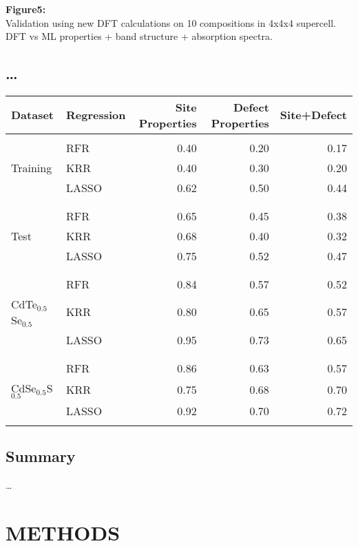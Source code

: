 \documentclass[aip, jmp, amsmath, amssymb]{revtex4-2}
\begin{document}
\textbf{Figure5:}\\
Validation using new DFT calculations on 10 compositions in 4x4x4
supercell. DFT vs ML properties + band structure + absorption spectra.\\

\subsection*{\ldots{}}
\label{sec:orgc05ecba}
\begin{center}
\begin{tabular}{llrrr}
\textbf{Dataset} & \textbf{Regression} & \textbf{Site Properties} & \textbf{Defect Properties} & \textbf{Site+Defect}\\
\hline
 &  &  &  & \\
 & RFR & 0.40 & 0.20 & 0.17\\
Training & KRR & 0.40 & 0.30 & 0.20\\
 & LASSO & 0.62 & 0.50 & 0.44\\
 &  &  &  & \\
 &  &  &  & \\
 & RFR & 0.65 & 0.45 & 0.38\\
Test & KRR & 0.68 & 0.40 & 0.32\\
 & LASSO & 0.75 & 0.52 & 0.47\\
 &  &  &  & \\
 &  &  &  & \\
 & RFR & 0.84 & 0.57 & 0.52\\
CdTe\(_{0.5}\)Se\(_{0.5}\) & KRR & 0.80 & 0.65 & 0.57\\
 & LASSO & 0.95 & 0.73 & 0.65\\
 &  &  &  & \\
 &  &  &  & \\
 & RFR & 0.86 & 0.63 & 0.57\\
CdSe\(_{0.5}\)S\(_{0.5}\) & KRR & 0.75 & 0.68 & 0.70\\
 & LASSO & 0.92 & 0.70 & 0.72\\
 &  &  &  & \\
\end{tabular}
\end{center}

\subsection*{Summary}
\label{sec:org6b55a79}
\ldots{}\\

\section*{METHODS}
\label{sec:org8b88a7b}
\end{document}
